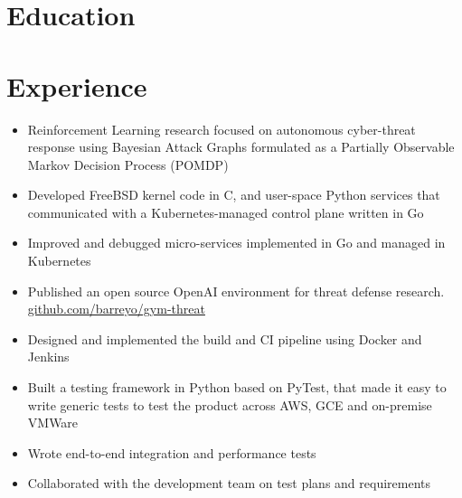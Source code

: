 \documentclass{cv_doc}
\begin{document}
\vspace{0.5cm}


\section*{Education}


\vspace{0.3cm}

\section*{Experience}


\begin{itemize}[label={\tiny\raisebox{1ex}{\textbullet}}]
  \item {Reinforcement Learning research focused on autonomous cyber-threat response using Bayesian Attack Graphs formulated as a Partially Observable
  Markov Decision Process (POMDP)}
  \item {Developed FreeBSD kernel code in C, and user-space Python services that
  communicated with a Kubernetes-managed control plane written in Go}
  \item {Improved and debugged micro-services implemented in Go and managed in Kubernetes}
  \item {Published an open source OpenAI environment for
  threat defense research. \href{https://github.com/barreyo/gym-threat}{github.com/barreyo/gym-threat}}
\end{itemize}


\begin{itemize}[label={\tiny\raisebox{1ex}{\textbullet}}]
  \item {Designed and implemented the build and CI pipeline using Docker and Jenkins}
  \item {Built a testing framework in Python based on PyTest, that made it easy
  to write generic tests to test the product across AWS, GCE and on-premise
  VMWare}
  \item {Wrote end-to-end integration and performance tests}
  \item {Collaborated with the development team on test plans and requirements}
\end{itemize}
\end{document}
